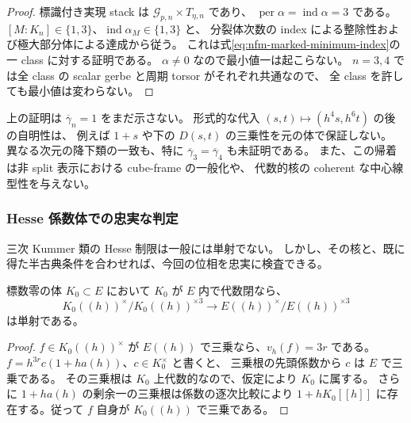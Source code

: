 \begin{proof}
標識付き実現 stack は $\mathscr G_{p,n}\times T_{\eta,n}$ であり、
$\operatorname{per}\alpha=\operatorname{ind}\alpha=3$ である。
$[M:K_n]\in\{1,3\}$、$\operatorname{ind}\alpha_M\in\{1,3\}$ と、
分裂体次数の index による整除性および極大部分体による達成から従う。
これは式\eqref{eq:nfm-marked-minimum-index}の一 class に対する証明である。
$\alpha\ne0$ なので最小値一は起こらない。
$n=3,4$ では全 class の scalar gerbe と周期 torsor がそれぞれ共通なので、
全 class を許しても最小値は変わらない。
\end{proof}

\begin{remark}[この帰着が決めない値]
上の証明は $\overline\gamma_n=1$ をまだ示さない。
形式的な代入 $(s,t)\mapsto(h^4s,h^6t)$ の後の自明性は、
例えば $1+s$ や下の $D(s,t)$ の三乗性を元の体で保証しない。
異なる次元の降下類の一致も、特に $\overline\gamma_3=\overline\gamma_4$ も未証明である。
また、この帰着は非 split 表示における cube-frame の一般化や、
代数的核の coherent な中心線型性を与えない。
\end{remark}

\subsubsection{Hesse 係数体での忠実な判定}

三次 Kummer 類の Hesse 制限は一般には単射でない。
しかし、その核と、既に得た半古典条件を合わせれば、今回の位相を忠実に検査できる。

\begin{lemma}
\label{lem:nfm-period-laurent-constant-injective}
標数零の体 $K_0\subset E$ において $K_0$ が $E$ 内で代数閉なら、
\[
 K_0((h))^\times/K_0((h))^{\times3}
 \longrightarrow E((h))^\times/E((h))^{\times3}
\]
は単射である。
\end{lemma}
\begin{proof}
$f\in K_0((h))^\times$ が $E((h))$ で三乗なら、$v_h(f)=3r$ である。
$f=h^{3r}c(1+h a(h))$、$c\in K_0^\times$ と書くと、
三乗根の先頭係数から $c$ は $E$ で三乗である。
その三乗根は $K_0$ 上代数的なので、仮定により $K_0$ に属する。
さらに $1+h a(h)$ の剰余一の三乗根は係数の逐次比較により
$1+hK_0[[h]]$ に存在する。従って $f$ 自身が $K_0((h))$ で三乗である。
\end{proof}

